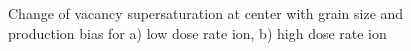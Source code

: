 \documentclass[a4paper]{article}
\begin{document}
      \begin{figure}[htb!]  %
        \centering
        \qquad
        \caption{Change of vacancy supersaturation at center with grain size and production bias for a) low dose rate ion, b) high dose rate ion}
        \label{figure:3D_supersaturation_ion}
      \end{figure}
\end{document}
